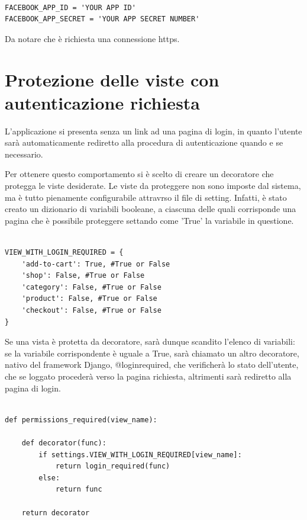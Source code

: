 \begin{lstlisting}

FACEBOOK_APP_ID = 'YOUR APP ID'
FACEBOOK_APP_SECRET = 'YOUR APP SECRET NUMBER'

\end{lstlisting}


Da notare che è richiesta una connessione https.

\section{Protezione delle viste con autenticazione richiesta}
L'applicazione si presenta senza un link ad una pagina di login, in quanto l'utente sarà automaticamente rediretto alla procedura di autenticazione quando e se necessario. 

Per ottenere questo comportamento si è scelto di creare un decoratore che protegga le viste desiderate.
Le viste da proteggere non sono imposte dal sistema, ma è tutto pienamente configurabile attravrso il file di setting. Infatti, è stato creato un dizionario di variabili booleane, a ciascuna delle quali corrisponde una pagina che è possibile proteggere settando come 'True' la variabile in questione.


\begin{lstlisting}

VIEW_WITH_LOGIN_REQUIRED = {
    'add-to-cart': True, #True or False
    'shop': False, #True or False
    'category': False, #True or False
    'product': False, #True or False
    'checkout': False, #True or False
}

\end{lstlisting}


Se una vista è protetta da decoratore, sarà dunque scandito l'elenco di variabili: se la variabile corrispondente è uguale a True, sarà chiamato un altro decoratore, nativo del framework Django, @login\textunderscore required, che verificherà lo stato dell'utente, che se loggato procederà verso la pagina richiesta, altrimenti sarà rediretto alla pagina di login.

\begin{lstlisting}

def permissions_required(view_name):
    
    def decorator(func):
        if settings.VIEW_WITH_LOGIN_REQUIRED[view_name]:
            return login_required(func)
        else:
            return func

    return decorator
    
\end{lstlisting}

